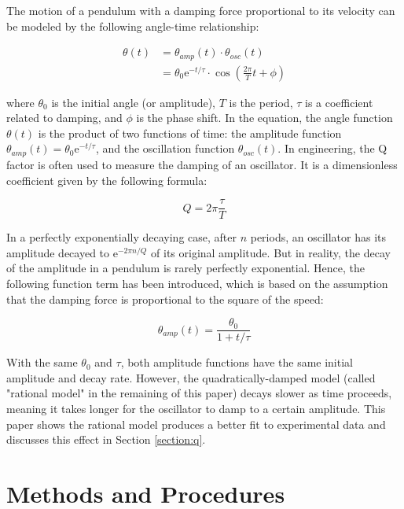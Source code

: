 \documentclass[12pt]{article}
\newcommand{\e}{\mathrm{e}}
\begin{document}
The motion of a pendulum with a damping force proportional to its velocity can be modeled by the following angle-time relationship: ~\cite{hyperphysics-oscda}

\begin{equation}
\label{equ:damped-osc}
\begin{aligned}
\theta(t)
&= \theta_{amp}(t) \cdot \theta_{osc}(t) \\
&= \theta_0 \e^{-t/\tau} \cdot \cos\left(\frac{2\pi}{T}t+\phi\right)
\end{aligned}
\end{equation}

where $\theta_0$ is the initial angle (or amplitude), $T$ is the period, $\tau$ is a coefficient related to damping, and $\phi$ is the phase shift. In the equation, the angle function $\theta(t)$ is the product of two functions of time: the amplitude function $\theta_{amp}(t)=\theta_0\e^{-t/\tau}$, and the oscillation function $\theta_{osc}(t)$. In engineering, the Q factor is often used to measure the damping of an oscillator. It is a dimensionless coefficient given by the following formula: ~\cite{wikipedia-q}

\begin{equation}
\label{equ:q}
Q=2\pi\frac{\tau}{T}
\end{equation}

In a perfectly exponentially decaying case, after $n$ periods, an oscillator has its amplitude decayed to $\e^{-2\pi n/Q}$ of its original amplitude. But in reality, the decay of the amplitude in a pendulum is rarely perfectly exponential. Hence, the following function term has been introduced, which is based on the assumption that the damping force is proportional to the square of the speed: ~\cite{quadratic-damp}

\begin{equation}
\label{equ:quadratic-damp}
\theta_{amp}(t) = \frac{\theta_0}{1+t/\tau}
\end{equation}

With the same $\theta_0$ and $\tau$, both amplitude functions have the same initial amplitude and decay rate. However, the quadratically-damped model (called "rational model" in the remaining of this paper) decays slower as time proceeds, meaning it takes longer for the oscillator to damp to a certain amplitude. This paper shows the rational model produces a better fit to experimental data and discusses this effect in Section \ref{section:q}.


\section{Methods and Procedures}
\end{document}
